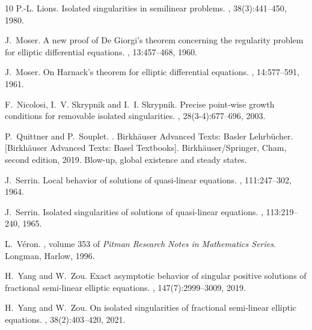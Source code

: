 \documentclass[11pt]{amsart}
\theoremstyle{plain}
\theoremstyle{definition}
\numberwithin{equation}{section}
\begin{document}
\begin{thebibliography}{10}
P.-L. Lions.
\newblock Isolated singularities in semilinear problems.
, 38(3):441--450, 1980.

J.~Moser.
\newblock A new proof of {D}e {G}iorgi's theorem concerning the regularity
  problem for elliptic differential equations.
, 13:457--468, 1960.

J.~Moser.
\newblock On {H}arnack's theorem for elliptic differential equations.
, 14:577--591, 1961.

F.~Nicolosi, I.~V. Skrypnik and I.~I. Skrypnik.
\newblock Precise point-wise growth conditions for removable isolated
  singularities.
, 28(3-4):677--696, 2003.

P.~Quittner and P.~Souplet.
.
\newblock Birkh\"{a}user Advanced Texts: Basler Lehrb\"{u}cher. [Birkh\"{a}user
  Advanced Texts: Basel Textbooks]. Birkh\"{a}user/Springer, Cham, second
  edition, 2019.
\newblock Blow-up, global existence and steady states.

J.~Serrin.
\newblock Local behavior of solutions of quasi-linear equations.
, 111:247--302, 1964.

J.~Serrin.
\newblock Isolated singularities of solutions of quasi-linear equations.
, 113:219--240, 1965.

L.~V\'eron.
, volume 353 of {\em Pitman Research Notes in Mathematics Series}.
\newblock Longman, Harlow, 1996.

H.~Yang and W.~Zou.
\newblock Exact asymptotic behavior of singular positive solutions of
  fractional semi-linear elliptic equations.
, 147(7):2999--3009, 2019.

H.~Yang and W.~Zou.
\newblock On isolated singularities of fractional semi-linear elliptic
  equations.
,
  38(2):403--420, 2021.

\end{thebibliography}
\end{document}
